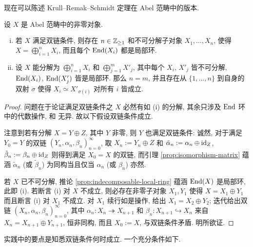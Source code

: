 现在可以陈述 Krull--Remak--Schmidt 定理在 Abel 范畴中的版本.
\begin{theorem}[M.\ Atiyah]\label{prop:Krull-Schmidt-gen}
	设 $X$ 是 Abel 范畴中的非零对象.
	\begin{enumerate}[(i)]
		\item 若 $X$ 满足双链条件, 则存在 $n \in \mathbb{Z}_{\geq 1}$ 和不可分解子对象 $X_1, \ldots, X_n$, 使得 $X = \bigoplus_{i=1}^n X_i$, 而且每个 $\operatorname{End}(X_i)$ 都是局部环.
		\item 设 $X$ 能分解为 $\bigoplus_{i=1}^n X_i$ 和 $\bigoplus_{j=1}^m X'_j$, 其中每个 $X_i$, $X'_j$ 皆不可分解, $\operatorname{End}(X_i)$, $\operatorname{End}(X'_j)$ 皆是局部环. 那么 $n=m$, 并且存在从 $\{1, \ldots, n\}$ 到自身的双射 $\sigma$ 使得 $X_i \simeq X'_{\sigma(i)}$ 对所有 $i$ 皆成立.
	\end{enumerate}
\end{theorem}
\begin{proof}
	问题在于论证满足双链条件之 $X$ 必然有如 (i) 的分解, 其余只涉及 $\operatorname{End}$ 环中的代数操作, 和 \cite[定理 6.12.8]{Li1} 无异. 故以下假设双链条件成立.

	注意到若有分解 $X = Y \oplus Z$, 其中 $Y$ 非零, 则 $Y$ 也满足双链条件: 诚然, 对于满足 $Y_0 = Y$ 的双链 $(Y_n, \alpha_n, \beta_n)_{n=0}^\infty$, 取 $X_n := Y_n \oplus Z$ 和 $\tilde{\alpha}_n := \alpha_n \oplus \mathrm{id}_Z$, $\tilde{\beta}_n := \beta_n \oplus \mathrm{id}_Z$ 则得到满足 $X_0 = X$ 的双链, 而引理 \ref{prop:isomorphism-matrix} 蕴涵 $\tilde{\alpha}_n$ (或 $\tilde{\beta}_n$) 为同构当且仅当 $\alpha_n$ (或 $\beta_n$) 亦然.

	若 $X$ 已不可分解, 推论 \ref{prop:indecomposable-local-ring} 蕴涵 $\operatorname{End}(X)$ 是局部环, 此即 (i). 若断言 (i) 对 $X$ 不成立, 则必存在非零子对象 $X_1, Y_1$ 使得 $X = X_1 \oplus Y_1$ 而且断言 (i) 对 $X_1$ 不成立. 对 $X_1$ 续行如是操作, 给出 $X_1 = X_2 \oplus Y_2$; 迭代给出双链 $(X_n, \alpha_n, \beta_n)_{n=0}^\infty$, 其中 $\alpha_n: X_n \twoheadrightarrow X_{n+1}$ 和 $\beta_n: X_{n+1} \hookrightarrow X_n$ 来自 $X_n = X_{n+1} \oplus Y_{n+1}$, 恒非同构, 而且 $X_0 := X$, 与双链条件矛盾. 明所欲证.
\end{proof}

实践中的要点是知悉双链条件何时成立. 一个充分条件如下.

